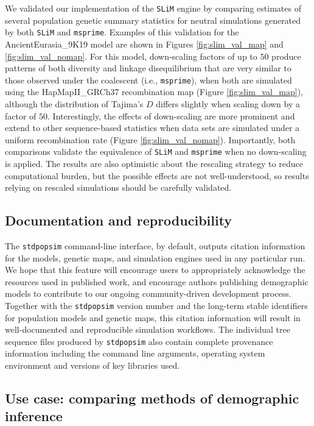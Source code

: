 \documentclass[12pt,halfline,a4paper]{ouparticle}
\newcommand{\stdpopsim}{\texttt{stdpopsim}\xspace}
\begin{document}
We validated our implementation of the \texttt{SLiM} engine by comparing
estimates of several population genetic summary statistics for neutral simulations generated by both \texttt{SLiM}
and \texttt{msprime}.
Examples of this validation for the AncientEurasia\_9K19 model
\citep{kamm2019efficiently}
are shown in Figures \ref{fig:slim_val_map} and \ref{fig:slim_val_nomap}.
For this model,
down-scaling factors of up to $50$ produce patterns of both diversity and linkage disequilibrium that are
very similar to those observed under the coalescent (i.e., \texttt{msprime}), when both are simulated using the HapMapII\_GRCh37 recombination map
(Figure \ref{fig:slim_val_map}),
although the distribution of Tajima's $D$ differs slightly when scaling down by a factor of $50$.
Interestingly, the effects of down-scaling are more prominent and extend to other sequence-based statistics
when data sets are simulated under a uniform recombination rate (Figure \ref{fig:slim_val_nomap}).
Importantly, both comparisons validate the equivalence of \texttt{SLiM} and \texttt{msprime} when no down-scaling is applied.
The results are also optimistic about the rescaling strategy to reduce computational burden,
but the possible effects are not well-understood,
so results relying on rescaled simulations should be carefully validated.

\subsection*{Documentation and reproducibility}

The \stdpopsim command-line interface, by default, outputs citation information
for the models, genetic maps, and simulation engines used in any particular run.
We hope that this feature will encourage users to appropriately acknowledge the
resources used in published work, and encourage authors
publishing demographic models to contribute to our ongoing community-driven development process.
Together with the \stdpopsim version number and the long-term stable identifiers
for population models and genetic maps,
this citation information will result in well-documented and reproducible
simulation workflows. The individual tree sequence files produced by
\stdpopsim also contain complete provenance information including the command
line arguments, operating system environment and versions of key libraries
used.

\subsection*{Use case: comparing methods of demographic inference}
\end{document}
